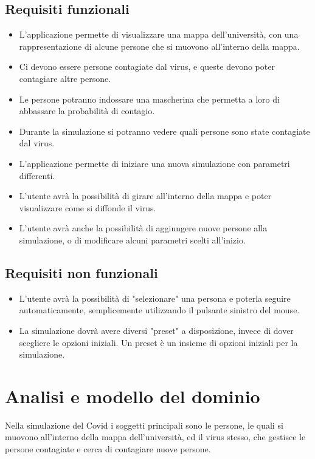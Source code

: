 \subsection{Requisiti funzionali}
\begin{itemize}
\item L'applicazione permette di visualizzare una mappa dell'università, con una rappresentazione di alcune persone che si muovono all'interno della mappa.
\item Ci devono essere persone contagiate dal virus, e queste devono poter contagiare altre persone.
\item Le persone potranno indossare una mascherina che permetta a loro di abbassare la probabilità di contagio.
\item Durante la simulazione si potranno vedere quali persone sono state contagiate dal virus.
\item L'applicazione permette di iniziare una nuova simulazione con parametri differenti.
\item L'utente avrà la possibilità di girare all'interno della mappa e poter visualizzare come si diffonde il virus.
\item L'utente avrà anche la possibilità di aggiungere nuove persone alla simulazione, o di modificare alcuni parametri scelti all'inizio.
\end{itemize}

\subsection{Requisiti non funzionali}
\begin{itemize}
\item L'utente avrà la possibilità di "selezionare" una persona e poterla seguire automaticamente, semplicemente utilizzando il pulsante sinistro del mouse.
\item La simulazione dovrà avere diversi "preset" a disposizione, invece di dover scegliere le opzioni iniziali. Un preset è un insieme di opzioni iniziali per la simulazione.
\end{itemize}

\section{Analisi e modello del dominio}
Nella simulazione del Covid i soggetti principali sono le persone, le quali si muovono all'interno della mappa dell'università, ed il virus stesso, che gestisce le persone contagiate e cerca di contagiare nuove persone.

